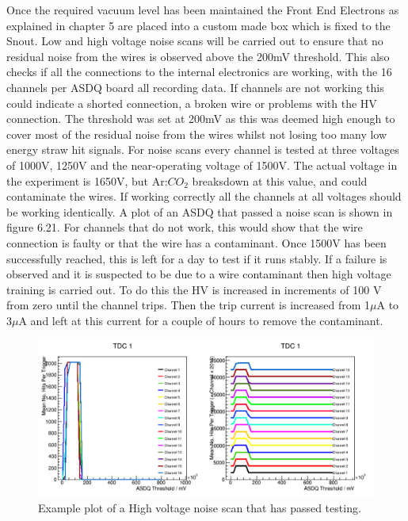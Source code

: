 Once the required vacuum level has been maintained the Front End Electrons as explained in chapter 5 are placed into a custom made box which is fixed to the Snout. Low and high voltage noise scans will be carried out to ensure that no residual noise from the wires is observed above the 200mV threshold. This also checks if all the connections to the internal electronics are working, with the 16 channels per ASDQ board all recording data. If channels are not working this could indicate a shorted connection, a broken wire or problems with the HV connection. The threshold was set at 200mV as this was deemed high enough to cover most of the residual noise from the wires whilst not losing too many low energy straw hit signals. For noise scans every channel is tested at three voltages of 1000V, 1250V and the near-operating voltage of 1500V. The actual voltage in the experiment is 1650V, but Ar:$CO_2$ breaksdown at this value, and could contaminate the wires. If working correctly all the channels at all voltages should be working identically. A plot of an ASDQ that passed a noise scan is shown in figure 6.21. For channels that do not work, this would show that the wire connection is faulty or that the wire has a contaminant. Once 1500V has been successfully reached, this is left for a day to test if it runs stably. If a failure is observed and it is suspected to be due to a wire contaminant then high voltage training is carried out. To do this the HV is increased in increments of 100 V from zero until the channel trips. Then the trip current is increased from 1$\mu$A to 3$\mu$A and left at this current for a couple of hours to remove the contaminant.

\begin{figure}[ht!]
\centering
\includegraphics[scale=0.8]{Figures/HighVNoiseScans}
\decoRule
\caption{Example plot of a High voltage noise scan that has passed testing.}
\label{fig:HighVNoiseScans}
\end{figure}

